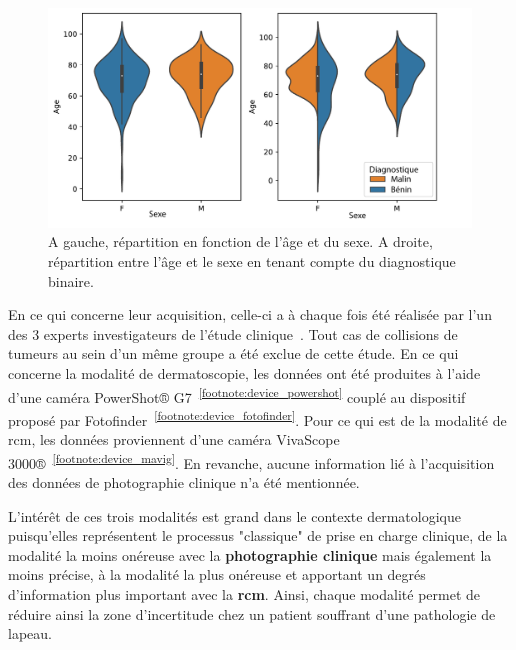 \begin{figure}[H]
    \centering
    \includegraphics[width=0.8\linewidth]{contents/chapter_2/resources/statistics.pdf}
    \caption{A gauche, répartition en fonction de l'âge et du sexe. A droite, répartition entre l'âge et le sexe en tenant compte du diagnostique binaire.}
    \label{fig:statistics}
\end{figure}\par

En ce qui concerne leur acquisition, celle-ci a à chaque fois été réalisée par l'un des 3 experts investigateurs de l'étude clinique~\cite{Cinotti2018}. Tout cas de collisions de tumeurs au sein d'un même groupe a été exclue de cette étude. En ce qui concerne la modalité de dermatoscopie, les données ont été produites à l'aide d'une caméra PowerShot® G7~\textsuperscript{\ref{footnote:device_powershot}} couplé au dispositif proposé par Fotofinder~\textsuperscript{\ref{footnote:device_fotofinder}}. Pour ce qui est de la modalité de \gls{rcm}, les données proviennent d'une caméra VivaScope 3000®~\textsuperscript{\ref{footnote:device_mavig}}. En revanche, aucune information lié à l'acquisition des données de photographie clinique n'a été mentionnée.\par

L'intérêt de ces trois modalités est grand dans le contexte dermatologique puisqu'elles représentent le processus "classique" de prise en charge clinique, de la modalité la moins onéreuse avec la \textbf{photographie clinique} mais également la moins précise, à la modalité la plus onéreuse et apportant un degrés d'information plus important avec la \textbf{\gls{rcm}}. Ainsi, chaque modalité permet de réduire ainsi la zone d'incertitude chez un patient souffrant d'une pathologie de lapeau.

\addtocounter{footnote}{1}
\addtocounter{footnote}{1}
\addtocounter{footnote}{1}

